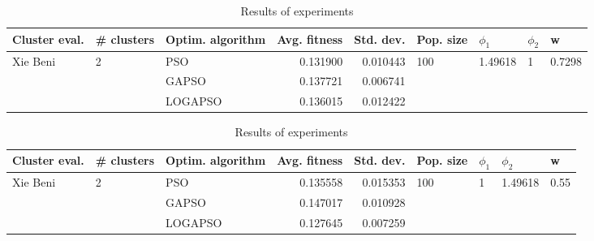 \documentclass{article}
\begin{document}
\begin{table}
\centering
\caption{Results of experiments}
\begin{tabular}{lllrrllll}
\toprule
            Cluster eval. &        \# clusters & Optim. algorithm &  Avg. fitness &  Std. dev. &            Pop. size &               $\phi_{1}$ &         $\phi_{2}$ &                       w \\
\midrule
\multirow{3}{*}{Xie Beni} & \multirow{3}{*}{2} &              PSO &      0.131900 &   0.010443 & \multirow{3}{*}{100} & \multirow{3}{*}{1.49618} & \multirow{3}{*}{1} & \multirow{3}{*}{0.7298} \\
                          &                    &            GAPSO &      0.137721 &   0.006741 &                      &                          &                    &                         \\
                          &                    &          LOGAPSO &      0.136015 &   0.012422 &                      &                          &                    &                         \\
\bottomrule
\end{tabular}
\end{table}
\begin{table}
\centering
\caption{Results of experiments}
\begin{tabular}{lllrrllll}
\toprule
            Cluster eval. &        \# clusters & Optim. algorithm &  Avg. fitness &  Std. dev. &            Pop. size &         $\phi_{1}$ &               $\phi_{2}$ &                     w \\
\midrule
\multirow{3}{*}{Xie Beni} & \multirow{3}{*}{2} &              PSO &      0.135558 &   0.015353 & \multirow{3}{*}{100} & \multirow{3}{*}{1} & \multirow{3}{*}{1.49618} & \multirow{3}{*}{0.55} \\
                          &                    &            GAPSO &      0.147017 &   0.010928 &                      &                    &                          &                       \\
                          &                    &          LOGAPSO &      0.127645 &   0.007259 &                      &                    &                          &                       \\
\bottomrule
\end{tabular}
\end{table}
\end{document}
